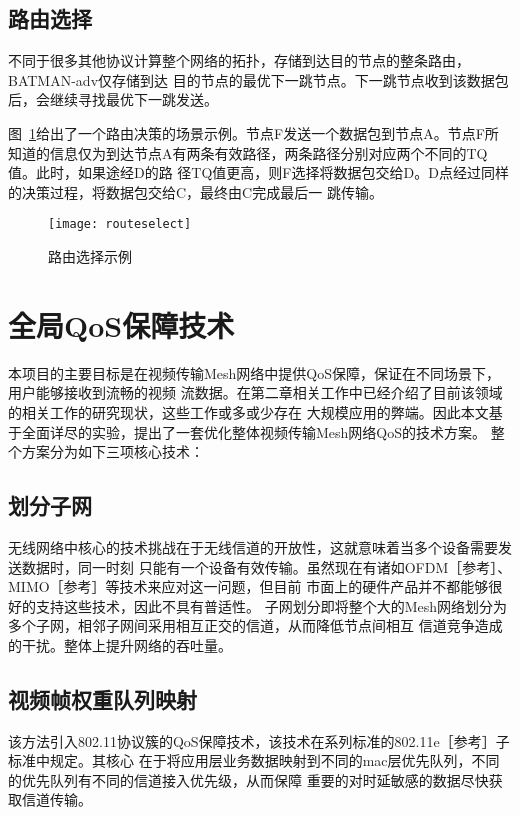 \subsection{路由选择}
不同于很多其他协议计算整个网络的拓扑，存储到达目的节点的整条路由，BATMAN-adv仅存储到达
目的节点的最优下一跳节点。下一跳节点收到该数据包后，会继续寻找最优下一跳发送。

图~\ref{fig:routeselect}给出了一个路由决策的场景示例。节点F发送一个数据包到节点A。节点F所
知道的信息仅为到达节点A有两条有效路径，两条路径分别对应两个不同的TQ值。此时，如果途经D的路
径TQ值更高，则F选择将数据包交给D。D点经过同样的决策过程，将数据包交给C，最终由C完成最后一
跳传输。

\begin{figure}[H] %
  \centering
  \texttt{[image: routeselect]}
  \caption{路由选择示例}
  \label{fig:routeselect}
\end{figure}

\section{全局QoS保障技术}
本项目的主要目标是在视频传输Mesh网络中提供QoS保障，保证在不同场景下，用户能够接收到流畅的视频
流数据。在第二章相关工作中已经介绍了目前该领域的相关工作的研究现状，这些工作或多或少存在
大规模应用的弊端。因此本文基于全面详尽的实验，提出了一套优化整体视频传输Mesh网络QoS的技术方案。
整个方案分为如下三项核心技术：

\subsection{划分子网}
    无线网络中核心的技术挑战在于无线信道的开放性，这就意味着当多个设备需要发送数据时，同一时刻
只能有一个设备有效传输。虽然现在有诸如OFDM［参考］、MIMO［参考］等技术来应对这一问题，但目前
市面上的硬件产品并不都能够很好的支持这些技术，因此不具有普适性。
    子网划分即将整个大的Mesh网络划分为多个子网，相邻子网间采用相互正交的信道，从而降低节点间相互
信道竞争造成的干扰。整体上提升网络的吞吐量。

\subsection{视频帧权重队列映射}
    该方法引入802.11协议簇的QoS保障技术，该技术在系列标准的802.11e［参考］子标准中规定。其核心
在于将应用层业务数据映射到不同的mac层优先队列，不同的优先队列有不同的信道接入优先级，从而保障
重要的对时延敏感的数据尽快获取信道传输。

